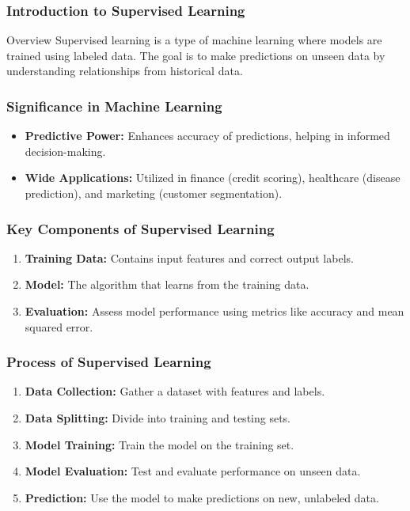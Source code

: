 \documentclass[aspectratio=169]{beamer}
\begin{document}
\frame{\titlepage}

\begin{frame}[fragile]
    \frametitle{Introduction to Supervised Learning}
    \begin{block}{Overview}
        Supervised learning is a type of machine learning where models are trained using labeled data. The goal is to make predictions on unseen data by understanding relationships from historical data.
    \end{block}
\end{frame}

\begin{frame}[fragile]
    \frametitle{Significance in Machine Learning}
    \begin{itemize}
        \item \textbf{Predictive Power:} Enhances accuracy of predictions, helping in informed decision-making.
        \item \textbf{Wide Applications:} Utilized in finance (credit scoring), healthcare (disease prediction), and marketing (customer segmentation).
    \end{itemize}
\end{frame}

\begin{frame}[fragile]
    \frametitle{Key Components of Supervised Learning}
    \begin{enumerate}
        \item \textbf{Training Data:} Contains input features and correct output labels. 
        \item \textbf{Model:} The algorithm that learns from the training data.
        \item \textbf{Evaluation:} Assess model performance using metrics like accuracy and mean squared error.
    \end{enumerate}
\end{frame}

\begin{frame}[fragile]
    \frametitle{Process of Supervised Learning}
    \begin{enumerate}
        \item \textbf{Data Collection:} Gather a dataset with features and labels.
        \item \textbf{Data Splitting:} Divide into training and testing sets.
        \item \textbf{Model Training:} Train the model on the training set.
        \item \textbf{Model Evaluation:} Test and evaluate performance on unseen data.
        \item \textbf{Prediction:} Use the model to make predictions on new, unlabeled data.
    \end{enumerate}
\end{frame}
\end{document}
